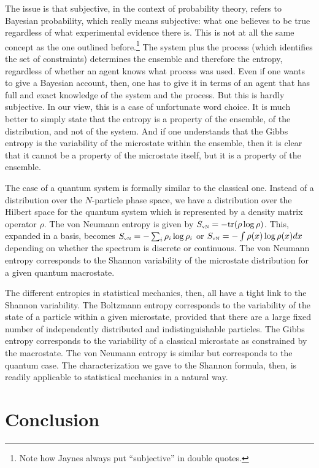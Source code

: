 \documentclass[iopart]{revtex4-1}
\begin{document}
The issue is that subjective, in the context of probability theory, refers to Bayesian probability, which really means subjective: what one believes to be true regardless of what experimental evidence there is. This is not at all the same concept as the one outlined before.\footnote{Note how Jaynes\cite{Jaynes2} always put ``subjective'' in double quotes.} The system plus the process (which identifies the set of constraints) determines the ensemble and therefore the entropy, regardless of whether an agent knows what process was used. Even if one wants to give a Bayesian account, then, one has to give it in terms of an agent that has full and exact knowledge of the system and the process. But this is hardly subjective. In our view, this is a case of unfortunate word choice. It is much better to simply state that the entropy is a property of the ensemble, of the distribution, and not of the system. And if one understands that the Gibbs entropy is the variability of the microstate within the ensemble, then it is clear that it cannot be a property of the microstate itself, but it is a property of the ensemble.

The case of a quantum system is formally similar to the classical one. Instead of a distribution over the $N$-particle phase space, we have a distribution over the Hilbert space for the quantum system which is represented by a density matrix operator $\rho$. The von Neumann entropy is given by $S_\textrm{\tiny{vN}} = - \textrm{tr}(\rho \log \rho)$. This, expanded in a basis, becomes $S_\textrm{\tiny{vN}} = - \sum_i \rho_i \log \rho_i$ or $S_\textrm{\tiny{vN}} = - \int \rho(x) \log \rho(x)dx$ depending on whether the spectrum is discrete or continuous.  The von Neumann entropy corresponds to the Shannon variability of the microstate distribution for a given quantum macrostate.

The different entropies in statistical mechanics, then, all have a tight link to the Shannon variability. The Boltzmann entropy corresponds to the variability of the state of a particle within a given microstate, provided that there are a large fixed number of independently distributed and indistinguishable particles. The Gibbs entropy corresponds to the variability of a classical microstate as constrained by the macrostate. The von Neumann entropy is similar but corresponds to the quantum case. The characterization we gave to the Shannon formula, then, is readily applicable to statistical mechanics in a natural way. 

\section{Conclusion}
\end{document}
